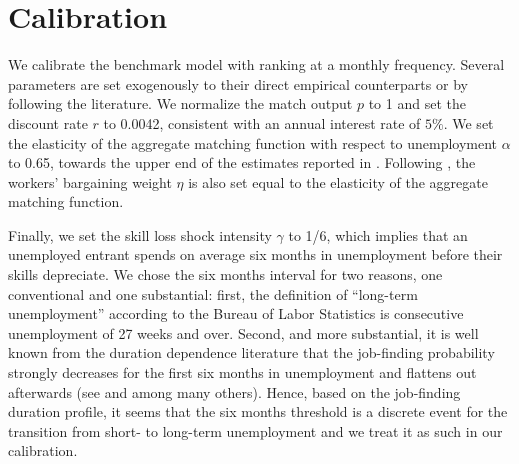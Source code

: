 \documentclass[12pt]{article} %
\theoremstyle{definition}
\begin{document}
\fi




\section{Calibration}\label{section calibration} 
We calibrate the benchmark model with ranking at a monthly frequency.
Several parameters are set exogenously to their direct empirical counterparts or by following the literature.
We normalize the match output $p$ to 1 and set the discount rate $r$ to 0.0042, consistent with an annual interest rate of $5\%$.
We set the elasticity of the aggregate matching function with respect to unemployment $\alpha$ to 0.65, towards the upper end of the estimates reported in \cite{petrongolo2001looking}.
Following \cite{shimer2005cyclical}, the workers' bargaining weight $\eta$ is also set equal to the elasticity of the aggregate matching function.

Finally, we set the skill loss shock intensity $\gamma$ to 1/6, which implies that an unemployed entrant spends on average six months in unemployment before their skills depreciate.
We chose the six months interval for two reasons, one conventional and one substantial: first, the definition of ``long-term unemployment'' according to the Bureau of Labor Statistics is consecutive unemployment of 27 weeks and over.
Second, and more substantial, it is well known from the duration dependence literature that the job-finding probability strongly decreases for the first six months in unemployment and flattens out afterwards (see \citealt{jarosch2019statistical} and \citealt{kospentaris2021unobserved} among many others).
Hence, based on the job-finding duration profile, it seems that the six months threshold is a discrete event for the transition from short- to long-term unemployment and we treat it as such in our calibration.
\end{document}
